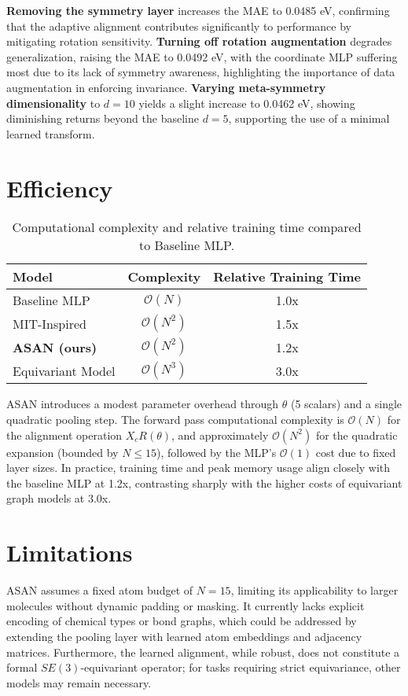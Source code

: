 \documentclass[12pt]{article}
\begin{document}
\textbf{Removing the symmetry layer} increases the MAE to 0.0485 eV, confirming that the adaptive alignment contributes significantly to performance by mitigating rotation sensitivity. \textbf{Turning off rotation augmentation} degrades generalization, raising the MAE to 0.0492 eV, with the coordinate MLP suffering most due to its lack of symmetry awareness, highlighting the importance of data augmentation in enforcing invariance. \textbf{Varying meta-symmetry dimensionality} to $d=10$ yields a slight increase to 0.0462 eV, showing diminishing returns beyond the baseline $d=5$, supporting the use of a minimal learned transform.

\section{Efficiency}
\begin{table}[h]
  \centering
  \begin{tabular}{lcc}
    \toprule
    Model & Complexity & Relative Training Time \\
    \midrule
    Baseline MLP & $\mathcal{O}(N)$ & 1.0x \\
    MIT-Inspired & $\mathcal{O}(N^2)$ & 1.5x \\
    \textbf{ASAN (ours)} & $\mathcal{O}(N^2)$ & 1.2x \\
    Equivariant Model & $\mathcal{O}(N^3)$ & 3.0x \\
    \bottomrule
  \end{tabular}
  \caption{Computational complexity and relative training time compared to Baseline MLP.}
  \label{tab:efficiency}
\end{table}

ASAN introduces a modest parameter overhead through $\theta$ (5 scalars) and a single quadratic pooling step. The forward pass computational complexity is $\mathcal{O}(N)$ for the alignment operation $X_c R(\theta)$, and approximately $\mathcal{O}(N^2)$ for the quadratic expansion (bounded by $N \leq 15$), followed by the MLP’s $\mathcal{O}(1)$ cost due to fixed layer sizes. In practice, training time and peak memory usage align closely with the baseline MLP at 1.2x, contrasting sharply with the higher costs of equivariant graph models at 3.0x.

\section{Limitations}
ASAN assumes a fixed atom budget of $N=15$, limiting its applicability to larger molecules without dynamic padding or masking. It currently lacks explicit encoding of chemical types or bond graphs, which could be addressed by extending the pooling layer with learned atom embeddings and adjacency matrices. Furthermore, the learned alignment, while robust, does not constitute a formal $SE(3)$-equivariant operator; for tasks requiring strict equivariance, other models may remain necessary.
\end{document}

